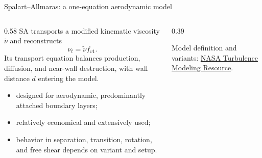 \documentclass[aspectratio=169,11pt]{beamer}
\begin{document}
\begin{frame}{Spalart--Allmaras: a one-equation aerodynamic model}
\begin{columns}[T,onlytextwidth]
\begin{column}{0.58\textwidth}
SA transports a modified kinematic viscosity $\tilde\nu$ and reconstructs
\[
  \nu_t=\tilde\nu f_{v1}.
\]
Its transport equation balances production, diffusion, and near-wall destruction, with wall distance $d$ entering the model.

\begin{itemize}\itemsep3pt
  \item designed for aerodynamic, predominantly attached boundary layers;
  \item relatively economical and extensively used;
  \item behavior in separation, transition, rotation, and free shear depends on variant and setup.
\end{itemize}
\end{column}
\begin{column}{0.39\textwidth}
\centering
{}

\vspace{0.35em}
{\scriptsize Model definition and variants: \href{https://tmbwg.github.io/turbmodels/spalart.html}{NASA Turbulence Modeling Resource}.\par}
\end{column}
\end{columns}
\end{frame}
\end{document}
